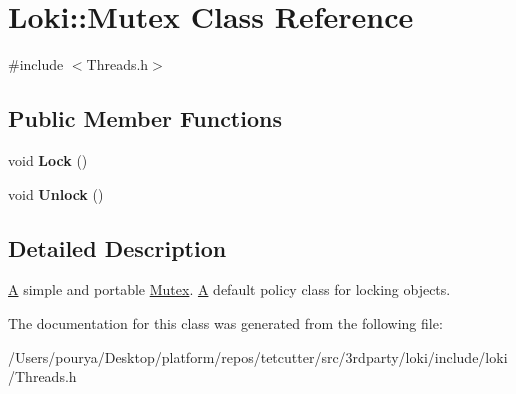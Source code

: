 \hypertarget{classLoki_1_1Mutex}{}\section{Loki\+:\+:Mutex Class Reference}
\label{classLoki_1_1Mutex}


{\ttfamily \#include $<$Threads.\+h$>$}

\subsection*{Public Member Functions}
\begin{DoxyCompactItemize}
\item 
\hypertarget{classLoki_1_1Mutex_a190a1d0d81f1a623d4b10c2ef49246df}{}void {\bfseries Lock} ()\label{classLoki_1_1Mutex_a190a1d0d81f1a623d4b10c2ef49246df}

\item 
\hypertarget{classLoki_1_1Mutex_a3a6f6671b80b8554af2491c29bf724cd}{}void {\bfseries Unlock} ()\label{classLoki_1_1Mutex_a3a6f6671b80b8554af2491c29bf724cd}

\end{DoxyCompactItemize}


\subsection{Detailed Description}
\hyperlink{structA}{A} simple and portable \hyperlink{classLoki_1_1Mutex}{Mutex}. \hyperlink{structA}{A} default policy class for locking objects. 

The documentation for this class was generated from the following file\+:\begin{DoxyCompactItemize}
\item 
/\+Users/pourya/\+Desktop/platform/repos/tetcutter/src/3rdparty/loki/include/loki/Threads.\+h\end{DoxyCompactItemize}
